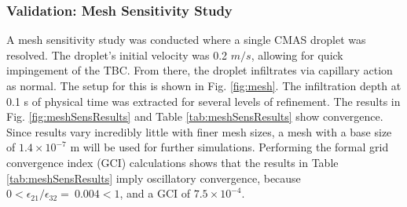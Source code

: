 \documentclass[%
 aip,
 amsmath,amssymb,
 reprint,%
]{revtex4-1}
\begin{document}
\subsubsection{Validation: Mesh Sensitivity Study}
A mesh sensitivity study was conducted where a single CMAS droplet was resolved. The droplet's initial velocity was 0.2 $m/s$, allowing for quick impingement of the TBC. From there, the droplet infiltrates via capillary action as normal. The setup for this is shown in Fig. \ref{fig:mesh}. The infiltration depth at 0.1 s of physical time was extracted for several levels of refinement. The results in Fig. \ref{fig:meshSensResults} and Table \ref{tab:meshSensResults} show convergence. Since results vary incredibly little with finer mesh sizes, a mesh with a base size of ${1.4\times 10^{-7}}$ m will be used for further simulations. Performing the formal grid convergence index (GCI) calculations \cite{ECA2014104, celik2008procedure} shows that the results in Table \ref{tab:meshSensResults} imply oscillatory convergence, because  $0<\epsilon_{21}/\epsilon_{32}=\ 0.004<1$, and a GCI of $7.5\times 10^{-4}$.

\end{document}
